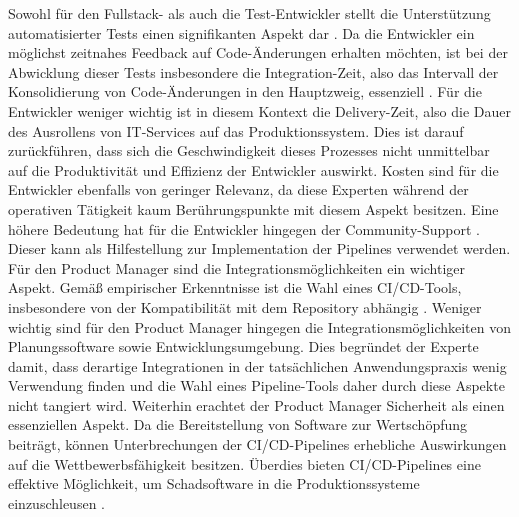 \vspace*{-15mm}
Sowohl für den Fullstack- als auch die Test-Entwickler stellt die Unterstützung automatisierter Tests einen signifikanten Aspekt dar \cite[Z. 5 ff.]{BackendTestDeveloperSAPDTSIntegration.}. Da die Entwickler ein möglichst zeitnahes Feedback auf Code-Änderungen erhalten möchten, ist bei der Abwicklung dieser Tests insbesondere die Integration-Zeit, also das Intervall der Konsolidierung von Code-Änderungen in den Hauptzweig, essenziell \cite[Z. 23 ff.]{TestDeveloperSAPHyperspaceAdoption&Onboarding.b}. Für die Entwickler weniger wichtig ist in diesem Kontext die Delivery-Zeit, also die Dauer des Ausrollens von IT-Services auf das Produktionssystem. Dies ist darauf zurückführen, dass sich die Geschwindigkeit dieses Prozesses nicht unmittelbar auf die Produktivität  und Effizienz der Entwickler auswirkt. Kosten sind für die Entwickler ebenfalls von geringer Relevanz, da diese Experten während der operativen Tätigkeit kaum Berührungspunkte mit diesem Aspekt besitzen. Eine höhere Bedeutung hat für die Entwickler hingegen der Community-Support \cite[Z. 25 ff.]{FullStackEntwicklerSAPDTSIntegration.}. Dieser kann als Hilfestellung zur Implementation der Pipelines verwendet werden. Für den Product Manager sind die Integrationsmöglichkeiten ein wichtiger Aspekt. Gemäß empirischer Erkenntnisse ist die Wahl eines CI/CD-Tools, insbesondere von der Kompatibilität mit dem Repository abhängig \cite[Z. 5 ff.]{exp8}. Weniger wichtig sind für den Product Manager hingegen die Integrationsmöglichkeiten von Planungssoftware sowie Entwicklungsumgebung. Dies begründet der Experte damit, dass derartige Integrationen in der tatsächlichen Anwendungspraxis wenig Verwendung finden und die Wahl eines Pipeline-Tools daher durch diese Aspekte nicht tangiert wird. Weiterhin erachtet der Product Manager Sicherheit als einen essenziellen Aspekt. Da die Bereitstellung von Software zur Wertschöpfung beiträgt, können Unterbrechungen der CI/CD-Pipelines erhebliche Auswirkungen auf die Wettbewerbsfähigkeit besitzen. Überdies bieten CI/CD-Pipelines eine effektive Möglichkeit, um Schadsoftware in die Produktionssysteme einzuschleusen \cite[Z. 5 ff.]{exp8}. 

